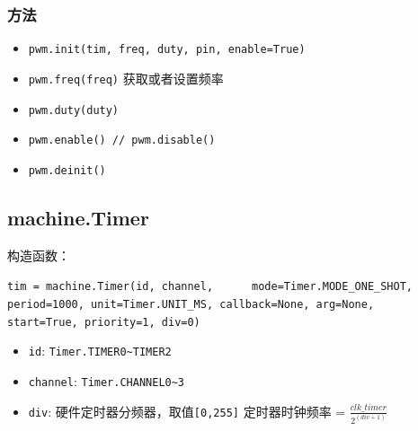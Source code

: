 \documentclass[UTF8]{ctexart}
\begin{document}
    \subsubsection{方法}
    \begin{itemize}
        \item \colorbox{mygrey}{\color{myred}\lstinline|pwm.init(tim, freq, duty, pin, enable=True)|}
        \item \colorbox{mygrey}{\color{myred}\lstinline|pwm.freq(freq)|}  获取或者设置频率
        \item \colorbox{mygrey}{\color{myred}\lstinline|pwm.duty(duty)|}
        \item \colorbox{mygrey}{\color{myred}\lstinline|pwm.enable() // pwm.disable()|}
        \item \colorbox{mygrey}{\color{myred}\lstinline|pwm.deinit()|}  
    \end{itemize}

    \subsection{machine.Timer}
    构造函数：
    \par
    \colorbox{mygrey}{\color{myred}\lstinline|tim = machine.Timer(id, channel, 
    mode=Timer.MODE_ONE_SHOT, period=1000, unit=Timer.UNIT_MS, callback=None, arg=None,
     start=True, priority=1, div=0)|}
    \begin{itemize}
        \item  \colorbox{mygrey}{\color{myred}\lstinline|id|}: \colorbox{mygrey}{\color{myred}\lstinline|Timer.TIMER0~TIMER2|}
        \item \colorbox{mygrey}{\color{myred}\lstinline|channel|}: \colorbox{mygrey}{\color{myred}\lstinline|Timer.CHANNEL0~3|}
        \item \colorbox{mygrey}{\color{myred}\lstinline|div|}:  硬件定时器分频器，取值\colorbox{mygrey}{\color{myred}\lstinline|[0,255]|} 定时器时钟频率 = $\frac{clk\_timer}{2^{(div+1)}}$
    \end{itemize}
\end{document}
